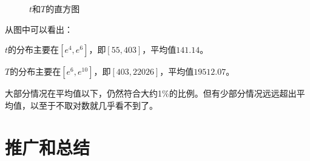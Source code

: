 \documentclass[a4paper,8pt]{article}
\begin{document}
\begin{figure}[htbp]
\centering
{}
\caption{$t$和$T$的直方图}\label{fig:hist}
\end{figure}

从图中可以看出：

$t$的分布主要在$[e^4,e^6]$，即$[55,403]$，平均值$141.14$。

$T$的分布主要在$[e^6,e^10]$，即$[403,22026]$，平均值$19512.07$。

大部分情况在平均值以下，仍然符合大约1\%的比例。但有少部分情况远远超出平均值，以至于不取对数就几乎看不到了。

\section{推广和总结}
\label{sec:extension}
\end{document}
